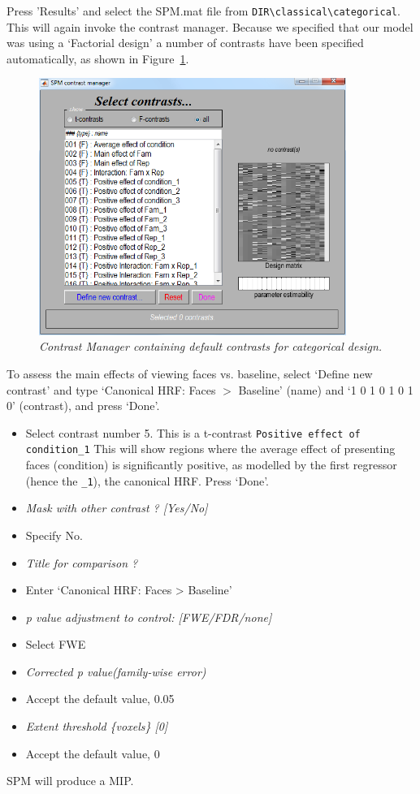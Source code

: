 \documentclass[a4paper,titlepage]{book}
\newcommand{\bi}{\begin{itemize}}
\newcommand{\ei}{\end{itemize}}
\begin{document}
Press 'Results' and select the SPM.mat file from 
\verb!DIR\classical\categorical!. This will again invoke the contrast manager. Because we specified that 
our model was using a `Factorial design' a number of 
contrasts have been specified automatically, as shown 
in Figure~\ref{cat_contrasts}.
\begin{figure}
\begin{center}
\includegraphics[width=100mm]{cat_contrasts}
\caption{\em Contrast Manager containing default contrasts for categorical design. \label{cat_contrasts}}
\end{center}
\end{figure}
To assess the main effects of viewing faces vs. baseline, select `Define new contrast' and type `Canonical HRF: Faces $>$ Baseline' (name) and `1 0 1 0 1 0 1 0' (contrast), and press `Done'.


\bi
\item{Select contrast number 5. This is a t-contrast \verb!Positive effect of condition_1! This will show 
regions where the average effect of presenting faces (condition) is significantly positive, as modelled by 
the first regressor (hence the \verb!_1!), the 
canonical HRF. Press `Done'.}
\item{\em Mask with other contrast ? [Yes/No]}
\item{Specify No.}
\item{\em Title for comparison ?}
\item{Enter `Canonical HRF: Faces > Baseline'}
\item{\em p value adjustment to control: [FWE/FDR/none]}
\item{Select FWE}
\item{\em Corrected p value(family-wise error)}
\item{Accept the default value, 0.05}
\item{\em Extent threshold \{voxels\} [0]}
\item{Accept the default value, 0}
\ei
SPM will produce a MIP.
\end{document}
